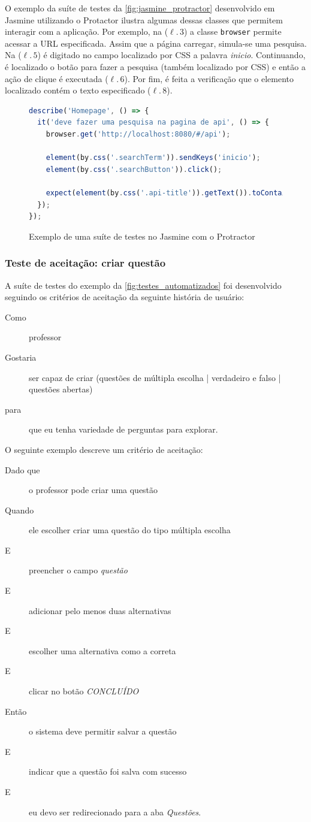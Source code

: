 O exemplo da suíte de testes da \autoref{fig:jasmine_protractor} desenvolvido em Jasmine utilizando
o Protactor ilustra algumas dessas classes que permitem interagir com a aplicação. Por exemplo, na
($\ell.\,3$) a classe \texttt{browser} permite acessar a URL especificada. Assim que a página carregar,
simula-se uma pesquisa. Na ($\ell.\,5$) é digitado no campo localizado por CSS a palavra \textit{inicio}.
Continuando, é localizado o botão para fazer a pesquisa (também localizado por CSS) e então a ação de clique é executada ($\ell.\,6$).
Por fim, é feita a verificação que o elemento localizado contém o texto especificado ($\ell.\,8$).

\begin{figure}[!ht]
\caption{Exemplo de uma suíte de testes no Jasmine com o Protractor}
\label{fig:jasmine_protractor}
\begin{lstlisting}[language=JavaScript]
describe('Homepage', () => {
  it('deve fazer uma pesquisa na pagina de api', () => {
    browser.get('http://localhost:8080/#/api');

    element(by.css('.searchTerm')).sendKeys('inicio');
    element(by.css('.searchButton')).click();

    expect(element(by.css('.api-title')).getText()).toContain('browser.inicio');
  });
});
\end{lstlisting}
\doautor
\end{figure}

\subsubsection{Teste de aceitação: criar questão}

A suíte de testes do exemplo da \autoref{fig:testes_automatizados} foi desenvolvido seguindo
os critérios de aceitação da seguinte história de usuário:
\begin{description}
  \item[Como] professor
  \item[Gostaria] ser capaz de criar (questões de múltipla escolha | verdadeiro e falso | questões abertas)
  \item[para] que eu tenha variedade de perguntas para explorar.
\end{description}
O seguinte exemplo descreve um critério de aceitação:
\begin{description}
  \item[Dado que] o professor pode criar uma questão
  \item[Quando] ele escolher criar uma questão do tipo múltipla escolha
  \item[E] preencher o campo \textit{questão}
  \item[E] adicionar pelo menos duas alternativas
  \item[E] escolher uma alternativa como a correta
  \item[E] clicar no botão \textit{CONCLUÍDO}
  \item[Então] o sistema deve permitir salvar a questão
  \item[E] indicar que a questão foi salva com sucesso
  \item[E] eu devo ser redirecionado para a aba \textit{Questões}.
\end{description}


